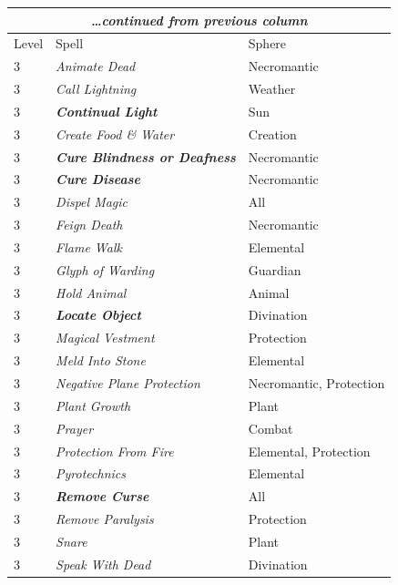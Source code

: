 \begin{multicols}{2}
\begin{minipage}{\columnwidth}
\end{minipage}

\noindent
\begin{tabular}{|p{}|p{}|p{}|}
\multicolumn{3}{c}{\textit{\ldots continued from previous column}} \\
\hline
Level	& Spell	& Sphere \\
\hline\hline
\rowcolor[gray]{.9}3	& \textit{Animate Dead}	& Necromantic \\
3	& \textit{Call Lightning}	& Weather \\
\rowcolor[gray]{.9}3	& \textbf{\textit{Continual Light}}	& Sun \\
3	& \textit{Create Food \& Water}	& Creation \\
\rowcolor[gray]{.9}3	& \textbf{\textit{Cure Blindness or Deafness}}	& Necromantic \\
3	& \textbf{\textit{Cure Disease}}	& Necromantic \\
\rowcolor[gray]{.9}3	& \textit{Dispel Magic}	& All \\
3	& \textit{Feign Death}	& Necromantic \\
\rowcolor[gray]{.9}3	& \textit{Flame Walk}	& Elemental \\
3	& \textit{Glyph of Warding}	& Guardian \\
\rowcolor[gray]{.9}3	& \textit{Hold Animal}	& Animal \\
3	& \textbf{\textit{Locate Object}}	& Divination \\
\rowcolor[gray]{.9}3	& \textit{Magical Vestment}	& Protection \\
3	& \textit{Meld Into Stone}	& Elemental \\
\rowcolor[gray]{.9}3	& \textit{Negative Plane Protection}	& Necromantic, Protection \\
3	& \textit{Plant Growth}	& Plant \\
\rowcolor[gray]{.9}3	& \textit{Prayer}	& Combat \\
3	& \textit{Protection From Fire}	& Elemental, Protection \\
\rowcolor[gray]{.9}3	& \textit{Pyrotechnics}	& Elemental \\
3	& \textbf{\textit{Remove Curse}}	& All \\
\rowcolor[gray]{.9}3	& \textit{Remove Paralysis}	& Protection \\
3	& \textit{Snare}	& Plant \\
\rowcolor[gray]{.9}3	& \textit{Speak With Dead}	& Divination \\

\end{tabular}
\end{multicols}
